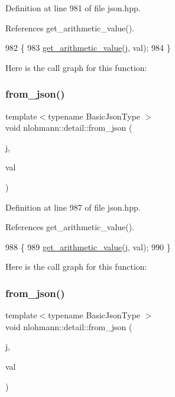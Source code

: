 Definition at line 981 of file json.\+hpp.



References get\+\_\+arithmetic\+\_\+value().


\begin{DoxyCode}
982 \{
983     \hyperlink{namespacenlohmann_1_1detail_a85955b9c6dd31846e4b8e891f78614b6}{get\_arithmetic\_value}(j, val);
984 \}
\end{DoxyCode}
Here is the call graph for this function\+:
\mbox{\label{namespacenlohmann_1_1detail_ace4d5680ba413d9fd897ccb5d9c61a1c}} 
\subsubsection{\texorpdfstring{from\+\_\+json()}{from\_json()}\hspace{0.1cm}{\footnotesize\ttfamily [4/14]}}
{\footnotesize\ttfamily template$<$typename Basic\+Json\+Type $>$ \\
void nlohmann\+::detail\+::from\+\_\+json (\begin{DoxyParamCaption}\item[{const Basic\+Json\+Type \&}]{j,  }\item[{typename Basic\+Json\+Type\+::number\+\_\+unsigned\+\_\+t \&}]{val }\end{DoxyParamCaption})}



Definition at line 987 of file json.\+hpp.



References get\+\_\+arithmetic\+\_\+value().


\begin{DoxyCode}
988 \{
989     \hyperlink{namespacenlohmann_1_1detail_a85955b9c6dd31846e4b8e891f78614b6}{get\_arithmetic\_value}(j, val);
990 \}
\end{DoxyCode}
Here is the call graph for this function\+:
\mbox{\label{namespacenlohmann_1_1detail_a047d881e611fcac709dc318f730a1732}} 
\subsubsection{\texorpdfstring{from\+\_\+json()}{from\_json()}\hspace{0.1cm}{\footnotesize\ttfamily [5/14]}}
{\footnotesize\ttfamily template$<$typename Basic\+Json\+Type $>$ \\
void nlohmann\+::detail\+::from\+\_\+json (\begin{DoxyParamCaption}\item[{const Basic\+Json\+Type \&}]{j,  }\item[{typename Basic\+Json\+Type\+::number\+\_\+integer\+\_\+t \&}]{val }\end{DoxyParamCaption})}



